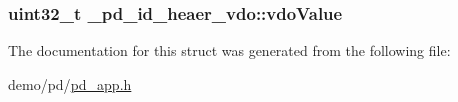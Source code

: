 \hypertarget{struct__pd__id__heaer__vdo_ab1f86734d25b3b0135b97b567dbbf827}{
\subsubsection[{vdo\-Value}]{\setlength{\rightskip}{0pt plus 5cm}uint32\-\_\-t \-\_\-pd\-\_\-id\-\_\-heaer\-\_\-vdo\-::vdo\-Value}}\label{struct__pd__id__heaer__vdo_ab1f86734d25b3b0135b97b567dbbf827}


The documentation for this struct was generated from the following file\-:\begin{DoxyCompactItemize}
\item 
demo/pd/\hyperlink{pd__app_8h}{pd\-\_\-app.\-h}\end{DoxyCompactItemize}
